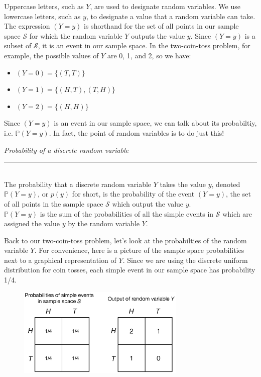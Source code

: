 \documentclass[12pt]{article}
\theoremstyle{definition}
\theoremstyle{remark}
\def\P{{\mathbb P}}
\def\cals{{\mathcal S}}
\begin{document}
Uppercase letters, such as $Y$, are used to designate random variables. We use lowercase letters, such as $y$, to designate a value that a random variable can take. The expression $(Y = y)$ is shorthand for the set of all points in our sample space $\cals$ for which the random variable $Y$ outputs the value $y$. Since $(Y = y)$ is a subset of $\cals$, it is an event in our sample space. In the two-coin-toss problem, for example, the possible values of $Y$ are 0, 1, and 2, so we have:
\begin{itemize}[noitemsep]
\item $(Y = 0) = \{ (T, T) \}$
\item $(Y = 1) = \{ (H, T), (T, H) \}$
\item $(Y = 2) = \{ (H, H) \}$
\end{itemize}

Since $(Y = y)$ is an event in our sample space, we can talk about its probabiltiy, i.e. $\P(Y = y)$. In fact, the point of random variables is to do just this! 

\begin{framed}
  \emph{Probability of a discrete random variable }\\
  \rule{\dimexpr{}\fboxrule}{.1pt} \\
  The probability that a discrete random variable $Y$ takes the value $y$, denoted $\P(Y = y)$, or $p(y)$ for short, is the probability of the event $(Y = y)$, the set of all points in the sample space $\cals$ which output the value $y$. \\

  $\P(Y = y)$ is the sum of the probabilities of all the simple events in $\cals$ which are assigned the value $y$ by the random variable $Y$.
\end{framed}

Back to our two-coin-toss problem, let's look at the probabilties of the random variable $Y$. For convenience, here is a picture of the sample space probabilities next to a graphical representation of $Y$. Since we are using the discrete uniform distribution for coin tosses, each simple event in our sample space has probability 1/4.
\begin{figure}[H]
\centering
\includegraphics[width=8cm]{numberofheads2.eps}
\end{figure}
\end{document}
